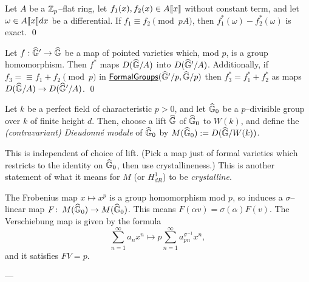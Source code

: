 \begin{theorem}
Let $A$ be a $\mathbb Z_p$--flat ring, let $f_1(x), f_2(x) \in A\llbracket{x}\rrbracket$ without constant term, and let $\omega \in A\llbracket{x}\rrbracket dx$ be a differential.  If $f_1 \equiv f_2 \pmod{pA}$, then $f_1^*(\omega) - f_2^*(\omega)$ is exact. \qed {}
\end{theorem}

\begin{corollary}
Let $f: \widehat{\mathbb G}' \to \widehat{\mathbb G}$ be a map of pointed varieties which, mod $p$, is a group homomorphism.  Then $f^*$ maps $D(\widehat{\mathbb G}/A)$ into $D(\widehat{\mathbb G}'/A)$.  Additionally, if $f_3 = \equiv f_1 + f_2 \pmod{p}$ in $\operatorname{\underline{\smash{\mathsf{FormalGroups}}}}(\widehat{\mathbb G}'/p, \widehat{\mathbb G}/p)$ then $f_3^* = f_1^* + f_2^*$ as maps $D(\widehat{\mathbb G}/A) \to D(\widehat{\mathbb G}'/A)$.  \qed
\end{corollary}

\begin{definition}
Let $k$ be a perfect field of characteristic $p > 0$, and let $\widehat{\mathbb G}_0$ be a $p$--divisible group over $k$ of finite height $d$.  Then, choose a lift $\widehat{\mathbb G}$ of $\widehat{\mathbb G}_0$ to $W(k)$, and define the \textit{(contravariant) Dieudonn\'e module} of $\widehat{\mathbb G}_0$ by $M(\widehat{\mathbb G}_0) := D(\widehat{\mathbb G} / W(k))$.
\end{definition}

This is independent of choice of lift.  (Pick a map just of formal varieties which restricts to the identity on $\widehat{\mathbb G}_0$, then use crystallineness.)  This is another statement of what it means for $M$ (or $H^1_{dR}$) to be \textit{crystalline}.

The Frobenius map $x \mapsto x^p$ is a group homomorphism mod $p$, so induces a $\sigma$--linear map $F\colon\thinspace M(\widehat{\mathbb G}_0) \to M(\widehat{\mathbb G}_0)$.  This means $F(\alpha v) = \sigma(\alpha) F(v)$.  The Verschiebung map is given by the formula \[\sum_{n=1}^\infty a_n x^n \mapsto p \sum_{n=1}^\infty a_{pn}^{\sigma^{-1}} x^n,\] and it satisfies $FV = p$.


---

